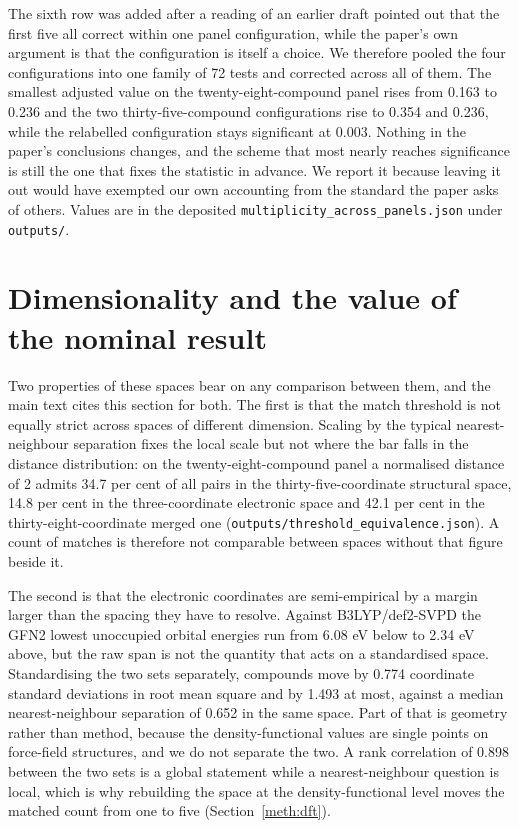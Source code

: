 \documentclass[11pt,a4paper]{article}
\begin{document}
The sixth row was added after a reading of an earlier draft pointed out that
the first five all correct within one panel configuration, while the paper's own
argument is that the configuration is itself a choice. We therefore pooled the
four configurations into one family of 72 tests and corrected across all of
them. The smallest adjusted value on the twenty-eight-compound panel rises from
0.163 to 0.236 and the two thirty-five-compound configurations rise to 0.354 and
0.236, while the relabelled configuration stays significant at 0.003. Nothing in
the paper's conclusions changes, and the scheme that most nearly reaches
significance is still the one that fixes the statistic in advance. We report it
because leaving it out would have exempted our own accounting from the standard
the paper asks of others. Values are in the deposited
\texttt{multiplicity\_across\_panels.json} under \texttt{outputs/}.

\section{Dimensionality and the value of the nominal result}
\label{res:dimdetail}

Two properties of these spaces bear on any comparison between them, and the main
text cites this section for both. The first is that the match threshold is not
equally strict across spaces of different dimension. Scaling by the typical
nearest-neighbour separation fixes the local scale but not where the bar falls
in the distance distribution: on the twenty-eight-compound panel a normalised
distance of 2 admits 34.7 per cent of all pairs in the thirty-five-coordinate
structural space, 14.8 per cent in the three-coordinate electronic space and
42.1 per cent in the thirty-eight-coordinate merged one
(\texttt{outputs/\allowbreak threshold\_\allowbreak equivalence.json}). A count of matches is therefore
not comparable between spaces without that figure beside it.

The second is that the electronic coordinates are semi-empirical by a margin
larger than the spacing they have to resolve. Against B3LYP/def2-SVPD the GFN2
lowest unoccupied orbital energies run from 6.08 eV below to 2.34 eV above, but
the raw span is not the quantity that acts on a standardised space. Standardising
the two sets separately, compounds move by 0.774 coordinate standard deviations
in root mean square and by 1.493 at most, against a median nearest-neighbour
separation of 0.652 in the same space. Part of that is geometry rather than
method, because the density-functional values are single points on force-field
structures, and we do not separate the two. A rank correlation of 0.898 between
the two sets is a global statement while a nearest-neighbour question is local,
which is why rebuilding the space at the density-functional level moves the
matched count from one to five (Section~\ref{meth:dft}).
\end{document}
